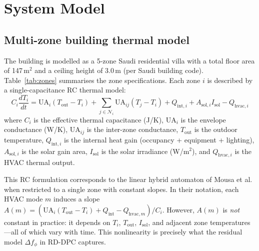 \documentclass[12pt]{article}
\theoremstyle{plain}
\theoremstyle{definition}
\begin{document}
\section{System Model}\label{sec:system}

\subsection{Multi-zone building thermal model}\label{sec:rc_model}

The building is modelled as a 5-zone Saudi residential villa with a total floor area of 147\,m$^2$ and a ceiling height of 3.0\,m (per Saudi building code). Table~\ref{tab:zones} summarises the zone specifications. Each zone $i$ is described by a single-capacitance RC thermal model:
\begin{equation}\label{eq:rc}
C_i \frac{dT_i}{dt} = \text{UA}_i(T_{\text{out}} - T_i) + \sum_{j \in \mathcal{N}_i} \text{UA}_{ij}(T_j - T_i) + Q_{\text{int},i} + A_{\text{sol},i} I_{\text{sol}} - Q_{\text{hvac},i}
\end{equation}
where $C_i$ is the effective thermal capacitance (J/K), $\text{UA}_i$ is the envelope conductance (W/K), $\text{UA}_{ij}$ is the inter-zone conductance, $T_{\text{out}}$ is the outdoor temperature, $Q_{\text{int},i}$ is the internal heat gain (occupancy + equipment + lighting), $A_{\text{sol},i}$ is the solar gain area, $I_{\text{sol}}$ is the solar irradiance (W/m$^2$), and $Q_{\text{hvac},i}$ is the HVAC thermal output.

This RC formulation corresponds to the linear hybrid automaton of Mousa et al.~\cite{mousa2018optimal} when restricted to a single zone with constant slopes. In their notation, each HVAC mode $m$ induces a slope $A(m) = (\text{UA}_i(T_{\text{out}} - T_i) + Q_{\text{int}} - Q_{\text{hvac},m}) / C_i$. However, $A(m)$ is \emph{not} constant in practice: it depends on $T_i$, $T_{\text{out}}$, $I_{\text{sol}}$, and adjacent zone temperatures---all of which vary with time. This nonlinearity is precisely what the residual model $\Delta f_\phi$ in RD-DPC captures.
\end{document}
